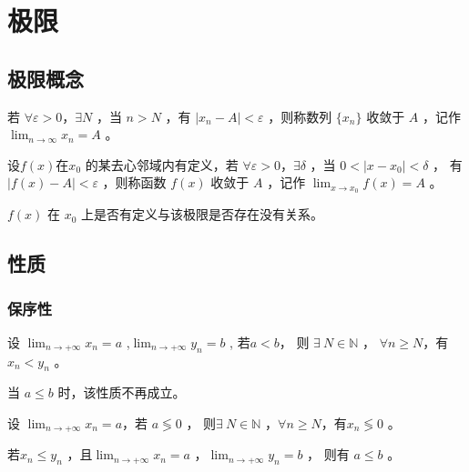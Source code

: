 \section{极限}

\subsection{极限概念}

若 $ \forall \varepsilon>0$，$ \exists N $ ，当 $ n>N $ ，有 $ |x_n-A|<\varepsilon $ ，则称数列 $ \{x_n\} $ 收敛于 $ A $  ，记作
$ \displaystyle\lim_{n\rightarrow\infty}x_n=A $ 。

设$ f(x) $在$ x_0 $ 的某去心邻域内有定义，若 $ \forall \varepsilon>0$，$ \exists \delta $ ，当 $ 0<|x-x_0|<\delta $ ，
有 $ |f(x)-A|<\varepsilon $ ，则称函数 $ f(x) $ 收敛于 $ A $  ，记作
$ \displaystyle\lim_{x\rightarrow x_0}f(x)=A $ 。

$ f(x) $ 在 $ x_{0} $ 上是否有定义与该极限是否存在没有关系。

\subsection{性质}

\subsubsection{保序性}

\begin{Theo}[保序性]

    设 $ \displaystyle\lim_{n\rightarrow +\infty}x_n=a $ ,$ \displaystyle\lim_{n\rightarrow +\infty}y_n=b $ ,
    若$ a<b $， 则 $ \exists\ N\in \mathbb{N}$ ， $ \forall n\geq N $，有 $ x_{n}<y_n $ 。
    
    当 $ a\leq b $ 时，该性质不再成立。
\end{Theo}

\begin{Infer}[保号性]

    设 $ \displaystyle\lim_{n\rightarrow +\infty}x_n=a $，若 $ a \lessgtr 0 $ ，
    则$ \exists\ N\in\mathbb{N} $ ，$ \forall n\geq N$，有$ x_{n}\lessgtr0 $  。
\end{Infer}

\begin{Theo}[\ ]

    若$ x_n\leq y_n $ ，且$ \displaystyle\lim_{n\rightarrow+\infty}x_n=a $ ，$ \displaystyle\lim_{n\rightarrow+\infty}y_n=b $ ，
    则有 $ a\leq  b $ 。
\end{Theo}

